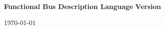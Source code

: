 \thispagestyle{empty}

\vspace*{6cm}

\begin{center}
\textbf{\Huge Functional Bus Description Language}
\vspace{1cm}
\newline
\textbf{\Large Version \VersionNumber}
\par\end{center}{\Large \par}


\vfill

\begin{center}
\today
\par\end{center}{\large \par}

\newpage
